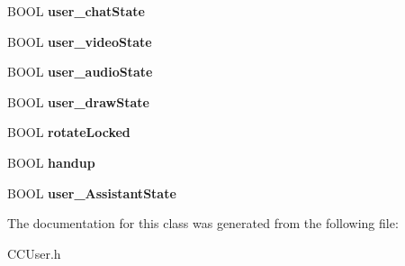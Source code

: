 \begin{DoxyCompactItemize}
\item 
\mbox{\label{interface_c_c_user_ac0498418e1f1b4e27b279d7786d99e87}} 
B\+O\+OL {\bfseries user\+\_\+chat\+State}
\item 
\mbox{\label{interface_c_c_user_a0b5801fac51f91ace435d73bab29381d}} 
B\+O\+OL {\bfseries user\+\_\+video\+State}
\item 
\mbox{\label{interface_c_c_user_a70a760fef8ef4f57294e2c46db996fcb}} 
B\+O\+OL {\bfseries user\+\_\+audio\+State}
\item 
\mbox{\label{interface_c_c_user_aeac6523413745c5fc4c1a13346dca006}} 
B\+O\+OL {\bfseries user\+\_\+draw\+State}
\item 
\mbox{\label{interface_c_c_user_a7458f8d6dc8eb850ad0b8713e8a76077}} 
B\+O\+OL {\bfseries rotate\+Locked}
\item 
\mbox{\label{interface_c_c_user_a452332372366d6ae3fb5612f5a67bb8a}} 
B\+O\+OL {\bfseries handup}
\item 
\mbox{\label{interface_c_c_user_a38e600e69cc6e4cab1b3e5b0f1ce7f92}} 
B\+O\+OL {\bfseries user\+\_\+\+Assistant\+State}
\end{DoxyCompactItemize}


The documentation for this class was generated from the following file\+:\begin{DoxyCompactItemize}
\item 
C\+C\+User.\+h\end{DoxyCompactItemize}
